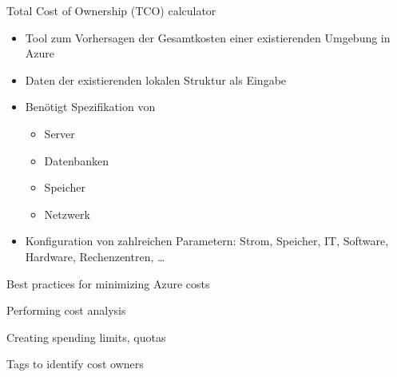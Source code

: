 \begin{flashcard}[Understand]{Total Cost of Ownership (TCO) calculator}
    \begin{itemize}
        \item Tool zum Vorhersagen der Gesamtkosten einer existierenden Umgebung in Azure
        \item Daten der existierenden lokalen Struktur als Eingabe
        \item Benötigt Spezifikation von
        \begin{itemize}
            \item Server
            \item Datenbanken
            \item Speicher
            \item Netzwerk
        \end{itemize}
        \item Konfiguration von zahlreichen Parametern:\newline
        Strom, Speicher, IT, Software, Hardware, Rechenzentren, \ldots
    \end{itemize}

\end{flashcard}

\begin{flashcard}[Understand]{Best practices for minimizing Azure costs}

\end{flashcard}

\begin{flashcard}[Understand]{Performing cost analysis}

\end{flashcard}

\begin{flashcard}[Understand]{Creating spending limits, quotas}

\end{flashcard}

\begin{flashcard}[Understand]{Tags to identify cost owners}

\end{flashcard}

